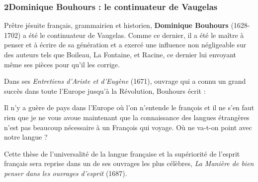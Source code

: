 \subsubsection*{2\quad Dominique Bouhours : le continuateur de Vaugelas}
Prêtre jésuite français, grammairien et historien, \textbf{Dominique Bouhours} (1628-1702) a été le continuateur de Vaugelas. Comme ce dernier, il a été le maître à penser et à écrire de sa génération et a exercé une influence non négligeable sur des auteurs tels que Boileau, La Fontaine, et Racine, ce dernier lui envoyant même ses pièces pour qu’il les corrige.

Dans ses \textit{Entretiens d’Ariste et d’Eugène} (1671), ouvrage qui a connu un grand succès dans toute l’Europe jusqu’à la Révolution, Bouhours écrit :
\begin{lecture}{}
Il n’y a guère de pays dans l’Europe où l’on n’entende le françois et il ne s’en faut rien que je ne vous avoue maintenant que la connaissance des langues étrangères n’est pas beaucoup nécessaire à un François qui voyage. Où ne va-t-on point avec notre langue ?
\end{lecture}
Cette thèse de l’universalité de la langue française et la supériorité de l’esprit français sera reprise dans un de ses ouvrages les plus célèbres, \textit{La Manière de bien penser dans les ouvrages d’esprit} (1687).
